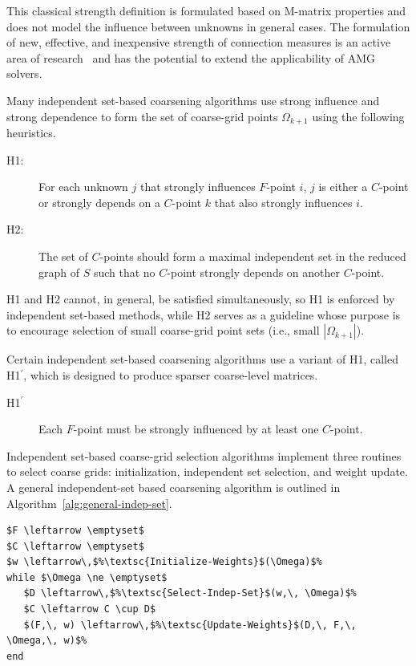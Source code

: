 \documentclass{elsart}
\newcommand{\hp}{H1$^\prime$}
\begin{document}
This classical strength definition is formulated based on M-matrix
properties and does not model the influence between unknowns in
general cases. The formulation of new, effective, and inexpensive
strength of connection measures is an active area of
research~\cite{Brannick2005} and has the potential to extend the
applicability of AMG solvers.

Many independent set-based coarsening algorithms use strong influence
and strong dependence to form the set of coarse-grid points
$\Omega_{k+1}$ using the following heuristics.
\begin{description}
\item[H1:] For each unknown $j$ that strongly influences $F$-point
  $i$, $j$ is either a $C$-point or strongly depends on a $C$-point
  $k$ that also strongly influences $i$.
\item[H2:] The set of $C$-points should form a maximal independent set
  in the reduced graph of $S$ such that no $C$-point strongly depends
  on another $C$-point.
\end{description}
H1 and H2 cannot, in general, be satisfied simultaneously, so H1 is
enforced by independent set-based methods, while H2 serves as a
guideline whose purpose is to encourage selection of small
coarse-grid point sets (i.e., small $|\Omega_{k+1}|$).

Certain independent set-based coarsening algorithms use a variant of
H1, called \hp, which is designed to produce sparser coarse-level
matrices.
\begin{description}
\item[\hp] Each $F$-point must be strongly influenced by at least one
  $C$-point.
\end{description}

Independent set-based coarse-grid selection algorithms implement three
routines to select coarse grids: initialization, independent set
selection, and weight update. A general independent-set based
coarsening algorithm is outlined in
Algorithm~\ref{alg:general-indep-set}.
\begin{lstlisting}[caption={Independent Set-Based Coarse Grid
Selection},label=alg:general-indep-set]
%\textsc{Indep-Set-Coarse-Grid-Selection}$(\Omega)$:%
$F \leftarrow \emptyset$
$C \leftarrow \emptyset$
$w \leftarrow\,$%\textsc{Initialize-Weights}$(\Omega)$%
while $\Omega \ne \emptyset$
   $D \leftarrow\,$%\textsc{Select-Indep-Set}$(w,\, \Omega)$%
   $C \leftarrow C \cup D$
   $(F,\, w) \leftarrow\,$%\textsc{Update-Weights}$(D,\, F,\, \Omega,\, w)$%
end
\end{lstlisting}
\end{document}
